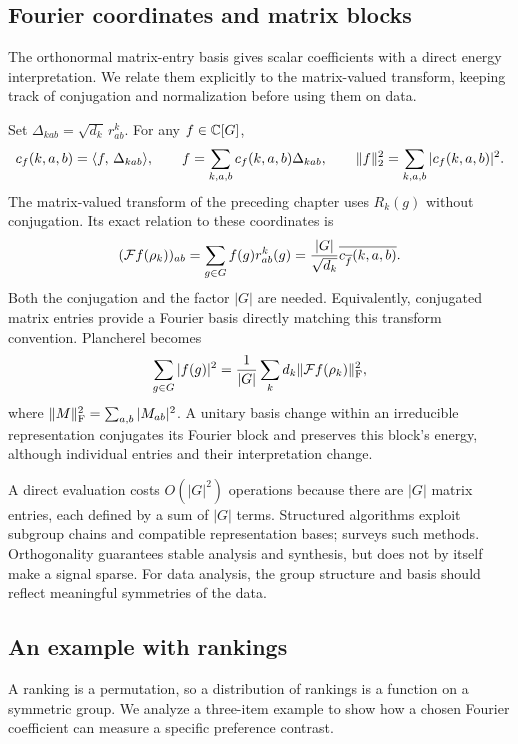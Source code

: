 \subsection{Fourier coordinates and matrix blocks}
\label{notation-97}

The orthonormal matrix-entry basis gives scalar coefficients with a direct
energy interpretation. We relate them explicitly to the matrix-valued
transform, keeping track of conjugation and normalization before using them
on data.

Set $\Delta_{kab}=\sqrt{d_k}\,r_{ab}^k$. For any $f\in\mathbb{C}[G]$,
\[
 c_f(k,a,b)=\langle f,\,\Delta_{kab}\rangle,\qquad
 f=\sum_{k,a,b}c_f(k,a,b)\Delta_{kab},\qquad
 \lVert f\rVert_2^2=\sum_{k,a,b}|c_f(k,a,b)|^2.
\]
The matrix-valued transform of the preceding chapter uses $R_k(g)$
without conjugation. Its exact relation to these coordinates is
\begin{equation}
\label{eq-lien-calcul-tfnoncommutative-coeff-fourier}
 (\mathcal{F} f(\rho_k))_{ab}
   =\sum_{g\in G}f(g)r_{ab}^k(g)
   =\frac{|G|}{\sqrt{d_k}}\overline{c_{\overline f}(k,a,b)}.
\end{equation}
Both the conjugation and the factor $|G|$ are needed. Equivalently,
conjugated matrix entries provide a Fourier basis directly matching this
transform convention. Plancherel becomes
\[
 \sum_{g\in G}|f(g)|^2
    =\frac1{|G|}\sum_k d_k\lVert\mathcal{F} f(\rho_k)\rVert_{\mathrm F}^2,
\]
where $\lVert M\rVert_{\mathrm F}^2=\sum_{a,b}|M_{ab}|^2$.
A unitary basis change within an irreducible representation conjugates its
Fourier block and preserves this block's energy, although individual
entries and their interpretation change.

A direct evaluation costs $O(|G|^2)$ operations because there are
$|G|$ matrix entries, each defined by a sum of $|G|$ terms. Structured
algorithms exploit subgroup chains and compatible representation bases;
\cite{rockmore-generalized} surveys such methods. Orthogonality guarantees
stable analysis and synthesis, but does not by itself make a signal sparse.
For data analysis, the group structure and basis should reflect meaningful
symmetries of the data.

\subsection{An example with rankings}

A ranking is a permutation, so a distribution of rankings is a function on a
symmetric group. We analyze a three-item example to show how a chosen
Fourier coefficient can measure a specific preference contrast.


